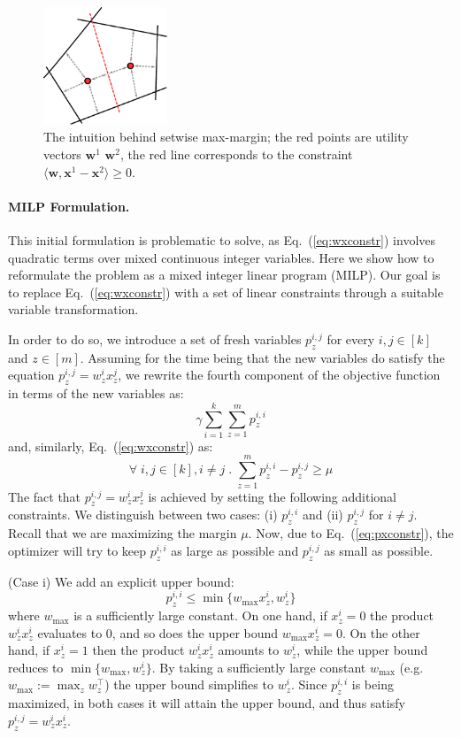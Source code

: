 \documentclass{article}
\renewcommand\[{\begin{equation}}
\renewcommand\]{\end{equation}}
\newcommand{\vecvar}[1]{\ensuremath{\boldsymbol{#1}}}
\newcommand{\vw}{\vecvar{w}}
\newcommand{\vx}{\vecvar{x}}
\begin{document}
\begin{figure}[t]
    \begin{center}
        \includegraphics[width=10em]{figures/setmargin}
    \end{center}
    \caption{\label{fig:setmargin} The intuition behind setwise max-margin; the red points are utility vectors $\vw^{1}$ $\vw^{2}$, the red line corresponds to the constraint $\langle \vw, \vx^{1} - \vx^{2} \rangle \ge 0$.}
\end{figure}

\paragraph{MILP Formulation.} This initial formulation is problematic to solve,
as Eq.~(\ref{eq:wxconstr}) involves quadratic terms over mixed continuous integer variables. 
Here we show how to reformulate the
problem as a mixed integer linear program (MILP). Our goal is to
replace Eq.~(\ref{eq:wxconstr}) with a set of linear constraints through
a suitable variable transformation.

In order to do so, we introduce a set of fresh variables $p^{i,j}_z$ for every
$i,j\in[k]$ and $z\in[m]$. Assuming for the time being that the new variables
do satisfy the equation $p^{i,j}_z = w^i_z x^j_z$, we rewrite the fourth
component of the objective function in terms of the new variables as:
%
$$ \gamma \sum_{i=1}^k \sum_{z=1}^m p^{i,i}_z$$
%
and, similarly, Eq.~(\ref{eq:wxconstr}) as:
%
\[ \forall \; i, j \in [k], i \neq j \;.\; \sum_{z=1}^m p^{i,i}_z - p^{i,j}_z \ge \mu \label{eq:pxconstr} \]
%
The fact that $p^{i,j}_z = w^{i}_z x^{j}_z$ is achieved by
setting the following additional constraints. We distinguish between two cases:
(i) $p^{i,i}_z$ and (ii) $p^{i,j}_z$ for $i \ne j$.  Recall that we are
maximizing the margin $\mu$. Now, due to Eq.~(\ref{eq:pxconstr}), the optimizer will
try to keep $p^{i,i}_z$ as large as possible and $p^{i,j}_z$ as small as
possible.

(Case i) We add an explicit upper bound:
%
$$ p^{i,i}_z \le \min \{ w_\text{max} x^{i}_z, w^{i}_z \} $$
%
where $w_\text{max}$ is a sufficiently large constant.
On one hand, if $x^i_z = 0$ the product $w^i_z x^i_z$ evaluates to $0$, and so does
the upper bound $w_\text{max} x^{i}_z = 0$. On the other hand, if $x^i_z=1$
then the product $w^i_z x^i_z$ amounts to $w^i_z$, while the upper
bound reduces to $\min \{ w_\text{max}, w^{i}_z \}$. By taking a sufficiently
large constant $w_\text{max}$ (e.g. $w_\text{max} := \max_z w^\top_z$) the
upper bound simplifies to $w^i_z$. Since $p^{i,i}_z$ is being maximized, in
both cases it will attain the upper bound, and thus satisfy $p^{i,j}_z = w^i_z x^i_z$.
\end{document}
